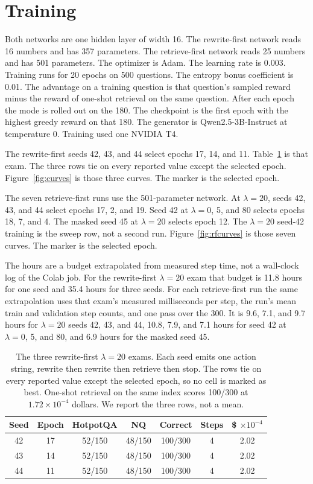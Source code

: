 \documentclass[letterpaper]{article}
\begin{document}
\FloatBarrier
\section{Training}
Both networks are one hidden layer of width 16. The rewrite-first network reads 16 numbers and has 357 parameters. The retrieve-first network reads 25 numbers and has 501 parameters. The optimizer is Adam. The learning rate is 0.003. Training runs for 20 epochs on 500 questions. The entropy bonus coefficient is 0.01. The advantage on a training question is that question's sampled reward minus the reward of one-shot retrieval on the same question. After each epoch the mode is rolled out on the 180. The checkpoint is the first epoch with the highest greedy reward on that 180. The generator is Qwen2.5-3B-Instruct at temperature 0. Training used one NVIDIA T4.

The rewrite-first seeds 42, 43, and 44 select epochs 17, 14, and 11. Table~\ref{tab:learned} is that exam. The three rows tie on every reported value except the selected epoch. Figure~\ref{fig:curves} is those three curves. The marker is the selected epoch.

The seven retrieve-first runs use the 501-parameter network. At \(\lambda{=}20\), seeds 42, 43, and 44 select epochs 17, 2, and 19. Seed 42 at \(\lambda{=}0\), 5, and 80 selects epochs 18, 7, and 4. The masked seed 45 at \(\lambda{=}20\) selects epoch 12. The \(\lambda{=}20\) seed-42 training is the sweep row, not a second run. Figure~\ref{fig:rfcurves} is those seven curves. The marker is the selected epoch.

The hours are a budget extrapolated from measured step time, not a wall-clock log of the Colab job. For the rewrite-first \(\lambda{=}20\) exam that budget is 11.8 hours for one seed and 35.4 hours for three seeds. For each retrieve-first run the same extrapolation uses that exam's measured milliseconds per step, the run's mean train and validation step counts, and one pass over the 300. It is 9.6, 7.1, and 9.7 hours for \(\lambda{=}20\) seeds 42, 43, and 44, 10.8, 7.9, and 7.1 hours for seed 42 at \(\lambda{=}0\), 5, and 80, and 6.9 hours for the masked seed 45.

\begin{table}[t]
\centering
\small
\setlength{\tabcolsep}{3pt}
\begin{tabular}{ccccccc}
\toprule
Seed & Epoch & HotpotQA & NQ & Correct & Steps & \$ \(\times 10^{-4}\) \\
\midrule
42 & 17 & 52/150 & 48/150 & 100/300 & 4 & 2.02 \\
43 & 14 & 52/150 & 48/150 & 100/300 & 4 & 2.02 \\
44 & 11 & 52/150 & 48/150 & 100/300 & 4 & 2.02 \\
\bottomrule
\end{tabular}
\caption{The three rewrite-first \(\lambda{=}20\) exams. Each seed emits one action string, rewrite then rewrite then retrieve then stop. The rows tie on every reported value except the selected epoch, so no cell is marked as best. One-shot retrieval on the same index scores 100/300 at \(1.72\times 10^{-4}\) dollars. We report the three rows, not a mean.}
\label{tab:learned}
\end{table}
\end{document}
